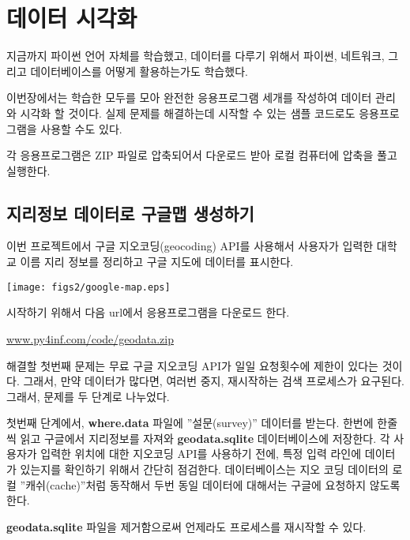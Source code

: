 
\chapter{데이터 시각화}

지금까지 파이썬 언어 자체를 학습했고, 데이터를 다루기 위해서 파이썬, 네트워크, 그리고 데이터베이스를 어떻게 활용하는가도 학습했다.

이번장에서는 학습한 모두를 모아 완전한 응용프로그램 세개를 작성하여 데이터 관리와 시각화 할 것이다.
실제 문제를 해결하는데 시작할 수 있는 샘플 코드로도 응용프로그램을 사용할 수도 있다.

각 응용프로그램은 ZIP 파일로 압축되어서 다운로드 받아 로컬 컴퓨터에 압축을 풀고 실행한다.

\section{지리정보 데이터로 구글맵 생성하기}

이번 프로젝트에서 구글 지오코딩(geocoding) API를 사용해서 사용자가 입력한 대학교 이름 지리 정보를 정리하고 구글 지도에 데이터를 표시한다.

\beforefig
\centerline{\texttt{[image: figs2/google-map.eps]}}
\afterfig

시작하기 위해서 다음 url에서 응용프로그램을 다운로드 한다.

\url{www.py4inf.com/code/geodata.zip}

해결할 첫번째 문제는 무료 구글 지오코딩 API가 일일 요청횟수에 제한이 있다는 것이다.
그래서, 만약 데이터가 많다면, 여러번 중지, 재시작하는 검색 프로세스가 요구된다.
그래서, 문제를 두 단계로 나누었다.


첫번째 단계에서, {\bf where.data} 파일에 ''설문(survey)'' 데이터를 받는다.
한번에 한줄씩 읽고 구글에서 지리정보를 자져와 {\bf geodata.sqlite} 데이터베이스에 저장한다.
각 사용자가 입력한 위치에 대한 지오코딩 API를 사용하기 전에, 특정 입력 라인에 데이터가 있는지를 확인하기 위해서 간단히 점검한다.
데이터베이스는 지오 코딩 데이터의 로컬 ''캐쉬(cache)''처럼 동작해서 두번 동일 데이터에 대해서는 구글에 요청하지 않도록 한다.

{\bf geodata.sqlite} 파일을 제거함으로써 언제라도 프로세스를 재시작할 수 있다.

